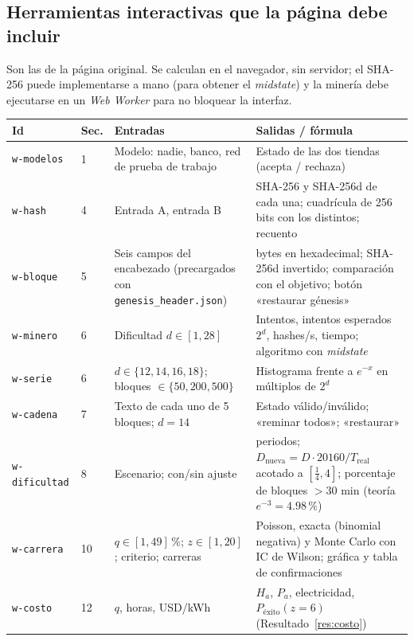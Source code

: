 \documentclass[11pt,a4paper]{article}
\newcommand{\webhint}[1]{}
\begin{document}
\subsection{Herramientas interactivas que la página debe incluir}

Son las de la página original. Se calculan en el navegador, sin servidor; el SHA-256 puede implementarse a mano (para obtener el \emph{midstate}) y la minería debe ejecutarse en un \emph{Web Worker} para no bloquear la interfaz.

\begin{center}
\webhint{table; id=tab-widgets; kind=widget-spec}
\footnotesize
\renewcommand{\arraystretch}{1.2}
\begin{tabularx}{\linewidth}{@{}l l >{\raggedright\arraybackslash}X >{\raggedright\arraybackslash}X@{}}
\toprule
\textbf{Id} & \textbf{Sec.} & \textbf{Entradas} & \textbf{Salidas / fórmula}\\
\midrule
\texttt{w-modelos} & 1 & Modelo: nadie, banco, red de prueba de trabajo & Estado de las dos tiendas (acepta / rechaza)\\
\texttt{w-hash} & 4 & Entrada A, entrada B & SHA-256 y SHA-256d de cada una; cuadrícula de 256 bits con los distintos; recuento\\
\texttt{w-bloque} & 5 & Seis campos del encabezado (precargados con \texttt{genesis\_header.json}) & 80 bytes en hexadecimal; SHA-256d invertido; comparación con el objetivo; botón «restaurar génesis»\\
\texttt{w-minero} & 6 & Dificultad $d\in[1,28]$ & Intentos, intentos esperados $2^{d}$, hashes/s, tiempo; algoritmo con \emph{midstate}\\
\texttt{w-serie} & 6 & $d\in\{12,14,16,18\}$; bloques $\in\{50,200,500\}$ & Histograma frente a $e^{-x}$ en múltiplos de $2^{d}$\\
\texttt{w-cadena} & 7 & Texto de cada uno de 5 bloques; $d=14$ & Estado válido/inválido; «reminar todos»; «restaurar»\\
\texttt{w-dificultad} & 8 & Escenario; con/sin ajuste & 26 periodos; $D_{\text{nueva}}=D\cdot 20160/T_{\text{real}}$ acotado a $[\frac14,4]$; porcentaje de bloques $>30$ min (teoría $e^{-3}=4.98\,\%$)\\
\texttt{w-carrera} & 10 & $q\in[1,49]\,\%$; $z\in[1,20]$; criterio; carreras & Poisson, exacta (binomial negativa) y Monte Carlo con IC de Wilson; gráfica y tabla de confirmaciones\\
\texttt{w-costo} & 12 & $q$, horas, USD/kWh & $H_a$, $P_a$, electricidad, $P_{\text{éxito}}(z=6)$ (Resultado~\ref{res:costo})\\
\bottomrule
\end{tabularx}
\end{center}
\end{document}
